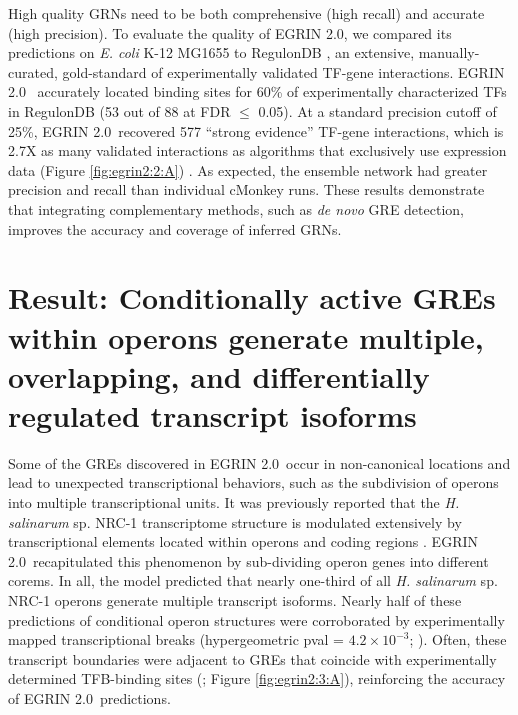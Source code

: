 \documentclass{article}
\newcommand{\tmsamp}[1]{\textsf{#1}}
\newcommand{\halo}{{\emph{H. salinarum} sp. NRC-1 }}
\newcommand{\eco}{\emph{E. coli} K-12 MG1655 }
\newcommand{\egrine}{{\tmsamp{EGRIN 2.0}}}
\begin{document}
High quality GRNs need to be both comprehensive (high recall) and accurate (high precision). To evaluate the quality of \egrine, we compared its predictions on \eco to RegulonDB \cite{gama-castro_regulondb_2011}, an extensive, manually-curated, gold-standard of experimentally validated TF-gene interactions. \egrine~ accurately located binding sites for 60\% of experimentally characterized TFs in RegulonDB (53 out of 88 at FDR $\leq$ 0.05). At a standard precision cutoff of 25\%, \egrine~recovered 577 ``strong evidence'' TF-gene interactions, which is 2.7X as many validated interactions as algorithms that exclusively use expression data (Figure \ref{fig:egrin2:2:A}) \cite{faith_large-scale_2007,marbach_wisdom_2012}. As expected, the ensemble network had greater precision and recall than individual cMonkey runs. These results demonstrate that integrating complementary methods, such as \textit{de novo} GRE detection, improves the accuracy and coverage of inferred GRNs. 

\section{Result: Conditionally active GREs within operons generate multiple, overlapping, and differentially regulated transcript isoforms}

Some of the GREs discovered in \egrine~occur in non-canonical locations and lead to unexpected transcriptional behaviors, such as the subdivision of operons into multiple transcriptional units.  It was previously reported that the \halo transcriptome structure is modulated extensively by transcriptional elements located within operons and coding regions \cite{koide_prevalence_2009}. \egrine~recapitulated this phenomenon by sub-dividing operon genes into different corems. In all, the model predicted that nearly one-third of all \halo operons generate multiple transcript isoforms. Nearly half of these predictions of conditional operon structures were corroborated by experimentally mapped transcriptional breaks (hypergeometric pval = $4.2\times10^{-3}$; \cite{koide_prevalence_2009}). Often, these transcript boundaries were adjacent to GREs that coincide with experimentally determined TFB-binding sites (\cite{facciotti_general_2007}; Figure \ref{fig:egrin2:3:A}), reinforcing the accuracy of \egrine~predictions.
\end{document}
